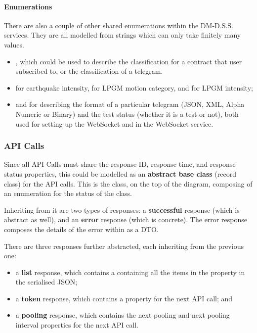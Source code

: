 \paragraph{Enumerations}

There are also a couple of other shared enumerations within the DM-D.S.S. services. They are all modelled from strings which can only take finitely many values.
\begin{itemize}
    \item {}, which could be used to describe the classification for a contract that user subscribed to, or the classification of a telegram.
    \item {} for earthquake intensity,  for LPGM motion category, and  for LPGM intensity;
    \item {} and  for describing the format of a particular telegram (JSON, XML, Alpha Numeric or Binary) and the test status (whether it is a test or not), both used for setting up the WebSocket and in the WebSocket service.
\end{itemize}

\subsubsection{API Calls}

Since all API Calls must share the response ID, response time, and response status properties, this could be modelled as an \textbf{abstract base class} (record class) for the API calls. This is the  class, on the top of the diagram, composing of an enumeration for the status of the class.

Inheriting from it are two types of responses: a \textbf{successful} response (which is abstract as well), and an \textbf{error} response (which is concrete). The error response composes the details of the error within as a DTO.

There are three responses further abstracted, each inheriting from the previous one:
\begin{itemize}
    \item a \textbf{list} response, which contains a  containing all the items in the  property in the serialised JSON;
    \item a \textbf{token} response, which contains a  property for the next API call; and
    \item a \textbf{pooling} response, which contains the next pooling and next pooling interval properties for the next API call.
\end{itemize}

